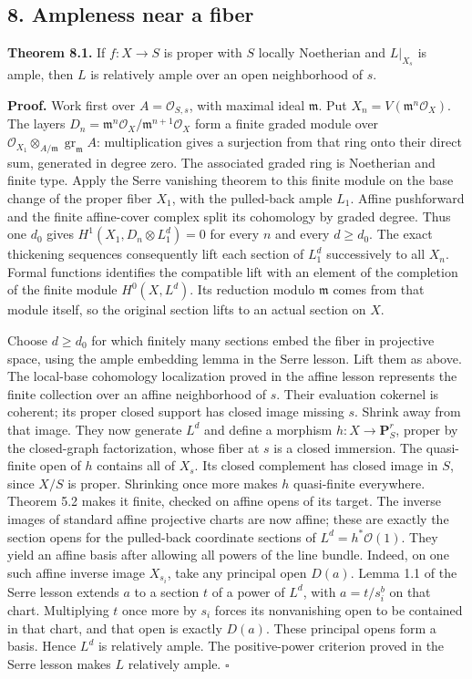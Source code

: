 \documentclass[11pt]{article}
\begin{document}
\subsection{8. Ampleness near a fiber}\label{ampleness-near-a-fiber}

\textbf{Theorem 8.1.} If \(f:X\to S\) is proper with \(S\) locally
Noetherian and \(L|_{X_s}\) is ample, then \(L\) is relatively ample
over an open neighborhood of \(s\).

\textbf{Proof.} Work first over \(A=\mathcal O_{S,s}\), with maximal
ideal \(\mathfrak m\). Put \(X_n=V(\mathfrak m^n\mathcal O_X)\). The
layers \(D_n=\mathfrak m^n\mathcal O_X/\mathfrak m^{n+1}\mathcal O_X\)
form a finite graded module over
\(\mathcal O_{X_1}\otimes_{A/\mathfrak m}\operatorname{gr}_{\mathfrak m}A\):
multiplication gives a surjection from that ring onto their direct sum,
generated in degree zero. The associated graded ring is Noetherian and
finite type. Apply the Serre vanishing theorem to this finite module on
the base change of the proper fiber \(X_1\), with the pulled-back ample
\(L_1\). Affine pushforward and the finite affine-cover complex split
its cohomology by graded degree. Thus one \(d_0\) gives
\(H^1(X_1,D_n\otimes L_1^d)=0\) for every \(n\) and every \(d\ge d_0\).
The exact thickening sequences consequently lift each section of
\(L_1^d\) successively to all \(X_n\). Formal functions identifies the
compatible lift with an element of the completion of the finite module
\(H^0(X,L^d)\). Its reduction modulo \(\mathfrak m\) comes from that
module itself, so the original section lifts to an actual section on
\(X\).

Choose \(d\ge d_0\) for which finitely many sections embed the fiber in
projective space, using the ample embedding lemma in the Serre lesson.
Lift them as above. The local-base cohomology localization proved in the
affine lesson represents the finite collection over an affine
neighborhood of \(s\). Their evaluation cokernel is coherent; its proper
closed support has closed image missing \(s\). Shrink away from that
image. They now generate \(L^d\) and define a morphism
\(h:X\to\mathbf P^r_S\), proper by the closed-graph factorization, whose
fiber at \(s\) is a closed immersion. The quasi-finite open of \(h\)
contains all of \(X_s\). Its closed complement has closed image in
\(S\), since \(X/S\) is proper. Shrinking once more makes \(h\)
quasi-finite everywhere. Theorem 5.2 makes it finite, checked on affine
opens of its target. The inverse images of standard affine projective
charts are now affine; these are exactly the section opens for the
pulled-back coordinate sections of \(L^d=h^*\mathcal O(1)\). They yield
an affine basis after allowing all powers of the line bundle. Indeed, on
one such affine inverse image \(X_{s_i}\), take any principal open
\(D(a)\). Lemma 1.1 of the Serre lesson extends \(a\) to a section \(t\)
of a power of \(L^d\), with \(a=t/s_i^b\) on that chart. Multiplying
\(t\) once more by \(s_i\) forces its nonvanishing open to be contained
in that chart, and that open is exactly \(D(a)\). These principal opens
form a basis. Hence \(L^d\) is relatively ample. The positive-power
criterion proved in the Serre lesson makes \(L\) relatively ample.
\(\square\)
\end{document}
